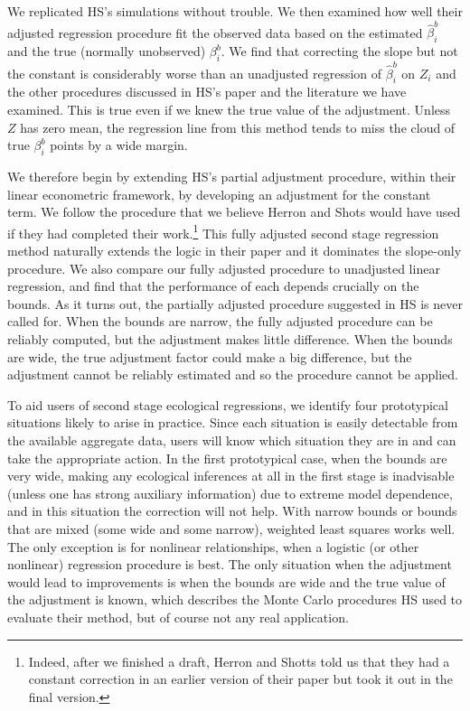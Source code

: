 \documentclass[11pt,titlepage]{article}
\begin{document}
We replicated HS's simulations without trouble.  We then examined how
well their adjusted regression procedure fit the observed data based
on the estimated $\hat\beta_i^b$ and the true (normally unobserved)
$\beta_i^b$.  We find that correcting the slope but not the constant
is considerably worse than an unadjusted regression of $\hat\beta_i^b$
on $Z_i$ and the other procedures discussed in HS's paper and the
literature we have examined.  This is true even if we knew the true
value of the adjustment.  Unless $Z$ has zero mean, the regression
line from this method tends to miss the cloud of true $\beta_i^b$
points by a wide margin.

We therefore begin by extending HS's partial adjustment procedure,
within their linear econometric framework, by developing an adjustment
for the constant term.  We follow the procedure that we believe Herron
and Shots would have used if they had completed their
work.\footnote{Indeed, after we finished a draft, Herron and Shotts
  told us that they had a constant correction in an earlier version of
  their paper but took it out in the final version.}  This fully
adjusted second stage regression method naturally extends the logic in
their paper and it dominates the slope-only procedure.  We also
compare our fully adjusted procedure to unadjusted linear regression,
and find that the performance of each depends crucially on the bounds.
As it turns out, the partially adjusted procedure suggested in HS is
never called for.  When the bounds are narrow, the fully adjusted
procedure can be reliably computed, but the adjustment makes little
difference.  When the bounds are wide, the true adjustment factor
could make a big difference, but the adjustment cannot be reliably
estimated and so the procedure cannot be applied.

To aid users of second stage ecological regressions, we identify four
prototypical situations likely to arise in practice.  Since each
situation is easily detectable from the available aggregate data,
users will know which situation they are in and can take the
appropriate action.  In the first prototypical case, when the bounds
are very wide, making any ecological inferences at all in the first
stage is inadvisable (unless one has strong auxiliary information) due
to extreme model dependence, and in this situation the correction will
not help.  With narrow bounds or bounds that are mixed (some wide and
some narrow), weighted least squares works well.  The only exception
is for nonlinear relationships, when a logistic (or other nonlinear)
regression procedure is best.  The only situation when the adjustment
would lead to improvements is when the bounds are wide and the true
value of the adjustment is known, which describes the Monte Carlo
procedures HS used to evaluate their method, but of course not any
real application.  
\end{document}
